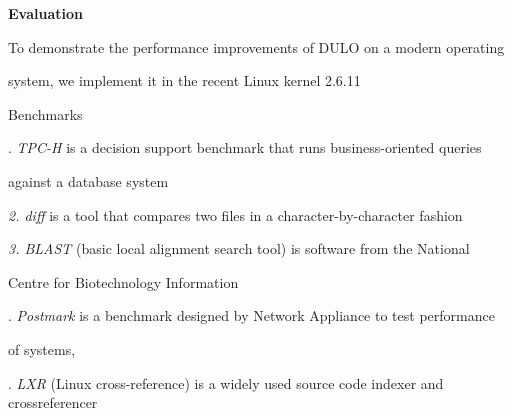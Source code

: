 \documentclass[12pt]{article}
\begin{document}
\setlength{\parskip}{8.04pt}
{\fontsize{16pt}{19.2pt}\selectfont \textbf{Evaluation }\par}\par

\setlength{\parskip}{0.0pt}
{\fontsize{10pt}{12.0pt}\selectfont To demonstrate the performance improvements of DULO on a modern operating\par}\par

\setlength{\parskip}{8.04pt}
{\fontsize{10pt}{12.0pt}\selectfont system, we implement it in the recent Linux kernel 2.6.11\par}\par

{\fontsize{10pt}{12.0pt}\selectfont Benchmarks\par}\par

\setlength{\parskip}{0.0pt}
{\fontsize{10pt}{12.0pt}.\textit{ TPC-H }is a decision support benchmark that runs business-oriented queries\par}\par

{\fontsize{10pt}{12.0pt}\selectfont against a database system\par}\par

{\fontsize{10pt}{12.0pt}\selectfont \textit{2. diff }is a tool that compares two files in a character-by-character fashion\par}\par

{\fontsize{10pt}{12.0pt}\selectfont \textit{3. BLAST }(basic local alignment search tool) is software from the National\par}\par

{\fontsize{10pt}{12.0pt}\selectfont Centre for Biotechnology Information\par}\par

{\fontsize{10pt}{12.0pt}.\textit{ Postmark }is a benchmark designed by Network Appliance to test performance\par}\par

{\fontsize{10pt}{12.0pt}\selectfont of systems,\par}\par

{\fontsize{10pt}{12.0pt}.\textit{ LXR }(Linux cross-reference) is a widely used source code indexer and crossreferencer\par}\par
\end{document}
